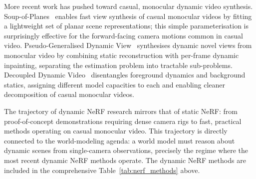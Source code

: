 More recent work has pushed toward casual, monocular dynamic video synthesis.
Soup-of-Planes~\citep{du2023soupofplanes} enables fast view synthesis of
casual monocular videos by fitting a lightweight set of planar scene
representations; this simple parameterisation is surprisingly effective
for the forward-facing camera motions common in casual video.
Pseudo-Generalised Dynamic View~\citep{zhao2024pgdvs} synthesises dynamic
novel views from monocular video by combining static reconstruction with
per-frame dynamic inpainting, separating the estimation problem into
tractable sub-problems.
Decoupled Dynamic Video~\citep{wang2024decoupleddynamic} disentangles
foreground dynamics and background statics, assigning different model
capacities to each and enabling cleaner decomposition of casual monocular videos.

The trajectory of dynamic NeRF research mirrors that of static NeRF: from
proof-of-concept demonstrations requiring dense camera rigs to fast,
practical methods operating on casual monocular video.
This trajectory is directly connected to the world-modeling agenda: a world
model must reason about dynamic scenes from single-camera observations,
precisely the regime where the most recent dynamic NeRF methods operate.
The dynamic NeRF methods are included in the comprehensive
Table~\ref{tab:nerf_methods} above.

